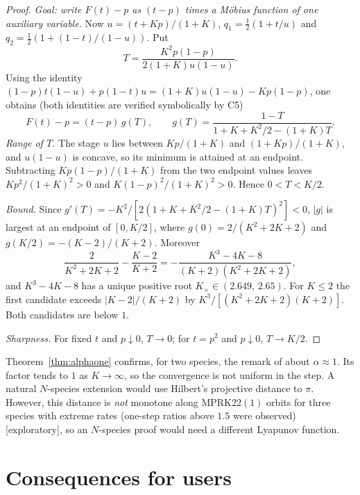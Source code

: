 \documentclass[11pt,a4paper]{article}
\theoremstyle{plain}
\theoremstyle{definition}
\newcommand{\status}[1]{\textsf{[#1]}}
\begin{document}
\begin{proof}
\emph{Goal: write $F(t)-p$ as $(t-p)$ times a M\"obius function of one auxiliary variable.} Now $u=(t+Kp)/(1+K)$, $q_1=\frac12(1+t/u)$ and $q_2=\frac12(1+(1-t)/(1-u))$. Put
\[
 T=\frac{K^2p(1-p)}{2(1+K)u(1-u)}.
\]
Using the identity $(1-p)t(1-u)+p(1-t)u=(1+K)u(1-u)-Kp(1-p)$, one obtains (both identities are verified symbolically by C5)
\[
 F(t)-p=(t-p)\,g(T),\qquad g(T)=\frac{1-T}{1+K+K^2/2-(1+K)T}.
\]
\emph{Range of $T$.} The stage $u$ lies between $Kp/(1+K)$ and $(1+Kp)/(1+K)$, and $u(1-u)$ is concave, so its minimum is attained at an endpoint. Subtracting $Kp(1-p)/(1+K)$ from the two endpoint values leaves $Kp^2/(1+K)^2>0$ and $K(1-p)^2/(1+K)^2>0$. Hence $0<T<K/2$.

\emph{Bound.} Since $g'(T)=-K^2/[2(1+K+K^2/2-(1+K)T)^2]<0$, $|g|$ is largest at an endpoint of $[0,K/2]$, where $g(0)=2/(K^2+2K+2)$ and $g(K/2)=-(K-2)/(K+2)$. Moreover
\[
 \frac{2}{K^2+2K+2}-\frac{K-2}{K+2}=-\frac{K^3-4K-8}{(K+2)(K^2+2K+2)},
\]
and $K^3-4K-8$ has a unique positive root $K_\times\in(2.649,\,2.65)$. For $K\le2$ the first candidate exceeds $|K-2|/(K+2)$ by $K^3/[(K^2+2K+2)(K+2)]$. Both candidates are below $1$.

\emph{Sharpness.} For fixed $t$ and $p\downarrow0$, $T\to0$; for $t=p^2$ and $p\downarrow0$, $T\to K/2$.
\end{proof}

Theorem~\ref{thm:alphaone} confirms, for two species, the remark of \cite{IKMS2024} about $\alpha\approx1$. Its factor tends to $1$ as $K\to\infty$, so the convergence is not uniform in the step. A natural $N$-species extension would use Hilbert's projective distance to $\pi$. However, this distance is \emph{not} monotone along MPRK22$(1)$ orbits for three species with extreme rates (one-step ratios above $1.5$ were observed) \status{exploratory}, so an $N$-species proof would need a different Lyapunov function.

\section{Consequences for users}\label{sec:users}
\end{document}
